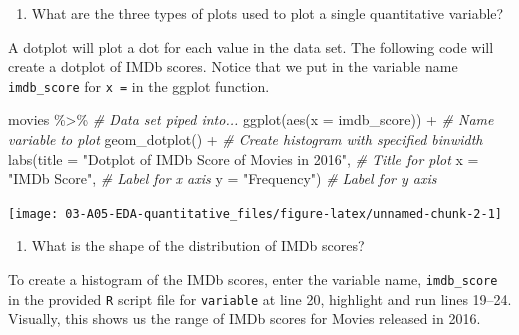 \documentclass[
]{report}
\newenvironment{Shaded}{\begin{snugshade}}{\end{snugshade}}
\newcommand{\AttributeTok}[1]{\textcolor[rgb]{0.77,0.63,0.00}{#1}}
\newcommand{\CommentTok}[1]{\textcolor[rgb]{0.56,0.35,0.01}{\textit{#1}}}
\newcommand{\FunctionTok}[1]{\textcolor[rgb]{0.00,0.00,0.00}{#1}}
\newcommand{\NormalTok}[1]{#1}
\newcommand{\SpecialCharTok}[1]{\textcolor[rgb]{0.00,0.00,0.00}{#1}}
\newcommand{\StringTok}[1]{\textcolor[rgb]{0.31,0.60,0.02}{#1}}
\providecommand{\tightlist}{%
  \setlength{\itemsep}{0pt}\setlength{\parskip}{0pt}}
\begin{document}
\begin{enumerate}
\def\labelenumi{\arabic{enumi}.}
\setcounter{enumi}{3}
\tightlist
\item
  What are the three types of plots used to plot a single quantitative variable?
\end{enumerate}

\newpage

A dotplot will plot a dot for each value in the data set. The following code will create a dotplot of IMDb scores. Notice that we put in the variable name \texttt{imdb\_score} for \texttt{x\ =} in the ggplot function.

\begin{Shaded}
\begin{Highlighting}[]
\NormalTok{movies }\SpecialCharTok{\%\textgreater{}\%} \CommentTok{\# Data set piped into...}
\FunctionTok{ggplot}\NormalTok{(}\FunctionTok{aes}\NormalTok{(}\AttributeTok{x =}\NormalTok{ imdb\_score)) }\SpecialCharTok{+}   \CommentTok{\# Name variable to plot}
  \FunctionTok{geom\_dotplot}\NormalTok{() }\SpecialCharTok{+}  \CommentTok{\# Create histogram with specified binwidth}
  \FunctionTok{labs}\NormalTok{(}\AttributeTok{title =} \StringTok{"Dotplot of IMDb Score of Movies in 2016"}\NormalTok{, }\CommentTok{\# Title for plot}
       \AttributeTok{x =} \StringTok{"IMDb Score"}\NormalTok{, }\CommentTok{\# Label for x axis}
       \AttributeTok{y =} \StringTok{"Frequency"}\NormalTok{) }\CommentTok{\# Label for y axis}
\end{Highlighting}
\end{Shaded}

\begin{center}\texttt{[image: 03-A05-EDA-quantitative\_files/figure-latex/unnamed-chunk-2-1]} \end{center}

\begin{enumerate}
\def\labelenumi{\arabic{enumi}.}
\setcounter{enumi}{4}
\tightlist
\item
  What is the shape of the distribution of IMDb scores?
\end{enumerate}

\vspace{0.2in}

To create a histogram of the IMDb scores, enter the variable name, \texttt{imdb\_score} in the provided \texttt{R} script file for \texttt{variable} at line 20, highlight and run lines 19--24. Visually, this shows us the range of IMDb scores for Movies released in 2016.
\end{document}
